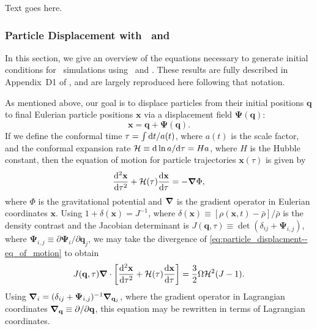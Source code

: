 Text goes here.



\subsubsection{Particle Displacement with \za\ and \lpt}
\label{subsubsec:computational_theory--perturbation_theory--particle_displacement}


In this section, we give an overview of the equations necessary to generate initial conditions for \nbody\ simulations using \za\ and \lpt.  These results are fully described in Appendix~D1 of \citet{1998MNRAS.299.1097S}, and are largely reproduced here following that notation.

As mentioned above, our goal is to displace particles from their initial positions $\mathbf{q}$ to final Eulerian particle positions $\mathbf{x}$ via a displacement field $\boldsymbol{\Psi}(\mathbf{q})$:
\begin{equation}
	\mathbf{x} = \mathbf{q} + \boldsymbol{\Psi}(\mathbf{q}).
\end{equation}
If we define the conformal time $\tau = \int {\rm {d}} t / a(t)$, where $a(t)$ is the scale factor, and the conformal expansion rate $\mathcal{H} \equiv {\rm {d}} \ln a/{\rm {d}} \tau = H a$, where $H$ is the Hubble constant, then the equation of motion for particle trajectories $\mathbf{x}(\tau)$ is given by
\begin{equation} \label{eq:particle_displacment--eq_of_motion}
	\frac{{\rm {d}}^{2} \mathbf{x}}{{\rm {d}} \tau^{2}} + \mathcal{H}(\tau) \frac{{\rm {d}} \mathbf{x}}{{\rm {d}} \tau} = -{\boldsymbol{\nabla}} \Phi,
\end{equation}
where $\Phi$ is the gravitational potential and ${\boldsymbol{\nabla}}$ is the gradient operator in Eulerian coordinates $\mathbf{x}$.  Using $1 + \delta(\mathbf{x}) = J^{-1}$, where $\delta(\mathbf{x}) \equiv [\rho(\mathbf{x},t) - \bar{\rho}] / \bar{\rho}$ is the density contrast and the Jacobian determinant is $J(\mathbf{q}, \tau) \equiv \det(\delta_{ij} + \boldsymbol{\Psi}_{i,j})$, where $\boldsymbol{\Psi}_{i,j} \equiv \partial \boldsymbol{\Psi}_{i} / \partial \mathbf{q}_{j}$, we may take the divergence of \ref{eq:particle_displacment--eq_of_motion} to obtain
\begin{equation} \label{eq:particle_displacement--div_eq_of_motion}
	J(\mathbf{q}, \tau) {\boldsymbol{\nabla}} \cdot \left[ \frac{{\rm {d}}^{2} \mathbf{x}}{{\rm {d}} \tau^{2}} + \mathcal{H}(\tau) \frac{{\rm {d}} \mathbf{x}}{{\rm {d}} \tau} \right]
	= \frac{3}{2} \Omega \mathcal{H}^{2}(J - 1).
\end{equation}
Using ${\boldsymbol{\nabla}}_{i} = (\delta_{ij} + \boldsymbol{\Psi}_{i,j})^{-1} {\boldsymbol{\nabla}}_{\mathbf{q}_{j}}$, where the gradient operator in Lagrangian coordinates ${\boldsymbol{\nabla}}_{\mathbf{q}} \equiv \partial / \partial \mathbf{q}$, this equation may be rewritten in terms of Lagrangian coordinates.

